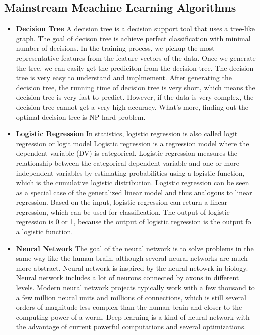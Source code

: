 \documentclass{article}
\begin{document}
\subsection{Mainstream Meachine Learning Algorithms}

\begin{itemize}
\item \textbf{Decision Tree}
A decision tree is a decision support tool that uses a tree-like graph.
The goal of decison tree is achieve perfect classification with minimal number of decisions.
In the training process, we pickup the most representative features from the feature vectors of the data.
Once we generate the tree, we can easily get the prediciton from the decision tree.
The decision tree is very easy to understand and implmement.
After generating the decision tree, the running time of decision tree is very short,
which means the decision tree is very fast to predict.
However, if the data is very complex, the decision tree cannot get a very high accuracy.
What's more, finding out the optimal decision tree is NP-hard problem.

\item \textbf{Logistic Regression}
In statistics, logistic regression is also called logit regression or logit model
Logistic regression is a regression model where the dependent variable (DV) is categorical.
Logistic regression measures the relationship between the categorical dependent variable and
one or more independent variables by estimating probabilities using a logistic function,
which is the cumulative logistic distribution.
Logistic regression can be seen as a special case of the generalized linear model and thus analogous to linear regression. 
Based on the input, logistic regression can return a linear regression, which can be used for classification.
The output of logistic regression is 0 or 1, because the output of logistic regression is the output fo a logistic function.

\item \textbf{Neural Network}
The goal of the neural network is to solve problems in the same way like the human brain,
although several neural networks are much more abstract.
Neural network is inspired by the neural netowrk in biology.
Neural network includes a lot of neurons connected by axons in different levels.
Modern neural network projects typically work with a few thousand
to a few million neural units and millions of connections,
which is still several orders of magnitude less complex than the
human brain and closer to the computing power of a worm.
Deep learning is a kind of neural network with the advantage of current powerful computations 
and several optimizations.


\end{itemize}
\end{document}

